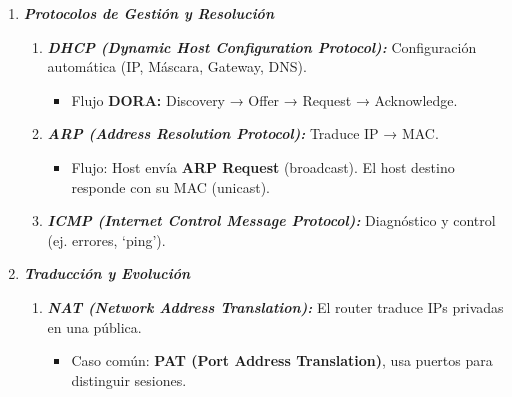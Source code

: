 \documentclass[12pt]{amsart}
\begin{document}
\begin{enumerate}
		\bigskip\bigskip

		\item \textbf{\textit{Protocolos de Gestión y Resolución}}
		
		\medskip
		\noindent
		
		\begin{enumerate}
			\item \textbf{\textit{DHCP (Dynamic Host Configuration Protocol):}} Configuración automática (IP, Máscara, Gateway, DNS).  
			\smallskip
				\begin{itemize}
					\item Flujo \textbf{DORA:} Discovery → Offer → Request → Acknowledge.
				\end{itemize}

			\medskip \medskip

			\item \textbf{\textit{ARP (Address Resolution Protocol):}} Traduce IP → MAC. 
				\begin{itemize}
					\item Flujo: Host envía \textbf{ARP Request} (broadcast). El host destino responde con su MAC (unicast). 
				\end{itemize}

			\medskip \medskip

			\item \textbf{\textit{ICMP (Internet Control Message Protocol):}} Diagnóstico y control (ej. errores, `ping').  

		\end{enumerate}
		
		\bigskip\bigskip

		\item \textbf{\textit{Traducción y Evolución}}
		
		\medskip
		\noindent
		
		\begin{enumerate}
			\item \textbf{\textit{NAT (Network Address Translation):}} El router traduce IPs privadas en una pública.  
			\smallskip
				\begin{itemize}
					\item Caso común: \textbf{PAT (Port Address Translation)}, usa puertos para distinguir sesiones.  
				\end{itemize}


\end{enumerate}
\end{enumerate}
\end{document}
